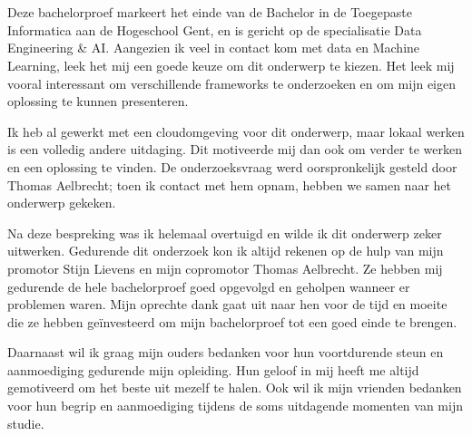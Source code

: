 
\chapter*{}%
\label{ch:voorwoord}
Deze bachelorproef markeert het einde van de Bachelor in de Toegepaste Informatica aan de Hogeschool Gent, en is gericht op de specialisatie Data Engineering \& AI. Aangezien ik veel in contact kom met data en Machine Learning, leek het mij een goede keuze om dit onderwerp te kiezen. Het leek mij vooral interessant om verschillende frameworks te onderzoeken en om mijn eigen oplossing te kunnen presenteren.

Ik heb al gewerkt met een cloudomgeving voor dit onderwerp, maar lokaal werken is een volledig andere uitdaging. Dit motiveerde mij dan ook om verder te werken en een oplossing te vinden. De onderzoeksvraag werd oorspronkelijk gesteld door Thomas Aelbrecht; toen ik contact met hem opnam, hebben we samen naar het onderwerp gekeken.

Na deze bespreking was ik helemaal overtuigd en wilde ik dit onderwerp zeker uitwerken. Gedurende dit onderzoek kon ik altijd rekenen op de hulp van mijn promotor Stijn Lievens en mijn copromotor Thomas Aelbrecht. Ze hebben mij gedurende de hele bachelorproef goed opgevolgd en geholpen wanneer er problemen waren. Mijn oprechte dank gaat uit naar hen voor de tijd en moeite die ze hebben geïnvesteerd om mijn bachelorproef tot een goed einde te brengen.

Daarnaast wil ik graag mijn ouders bedanken voor hun voortdurende steun en aanmoediging gedurende mijn opleiding. Hun geloof in mij heeft me altijd gemotiveerd om het beste uit mezelf te halen. Ook wil ik mijn vrienden bedanken voor hun begrip en aanmoediging tijdens de soms uitdagende momenten van mijn studie.

